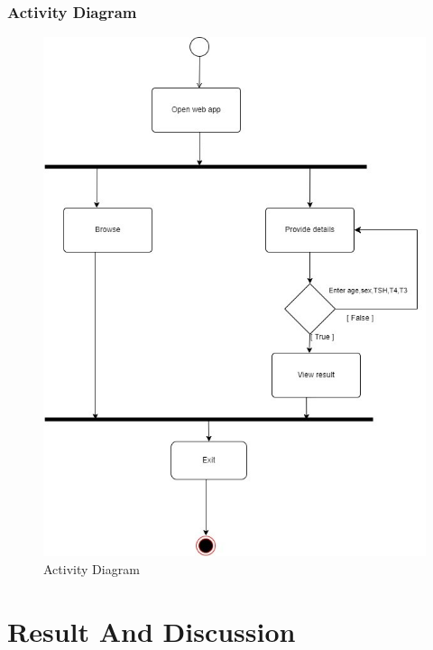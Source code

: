 \subsection{Activity Diagram}
\begin{figure}[h]
\centering
\includegraphics[scale=0.5]{activity.jpg}
\caption{Activity Diagram}
\end{figure}

\chapter{Result And Discussion}
